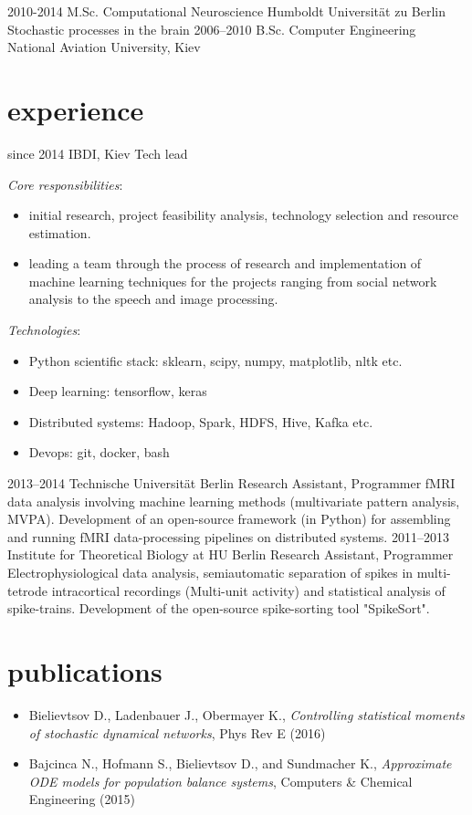 \documentclass[]{cv}
\begin{document}
\begin{entrylist}
  \entry
    {2010-2014}
    {M.Sc. Computational Neuroscience}
    {Humboldt Universität zu Berlin}
    {Stochastic processes in the brain}
  \entry
    {2006–2010}
    {B.Sc. Computer Engineering}
    {National Aviation University, Kiev}
    {}
\end{entrylist}

\section{experience}

\begin{entrylist}
  \entry
    {since 2014}
    {IBDI, Kiev}
    {Tech lead}
    {\emph{Core responsibilities}:
        \begin{itemize}
            \item initial research, project feasibility analysis, technology selection and resource estimation.
            \item leading a team through the process of research and implementation of machine learning techniques for the     projects ranging from social network analysis to the speech and image processing.
        \end{itemize}
    \emph{Technologies}:
        \begin{itemize}
            \item Python scientific stack: sklearn, scipy, numpy, matplotlib, nltk etc.
            \item Deep learning: tensorflow, keras
            \item Distributed systems: Hadoop, Spark, HDFS, Hive, Kafka etc.
            \item Devops: git, docker, bash
        \end{itemize}
    }
  \entry
    {2013–2014}
    {Technische Universität Berlin}
    {Research Assistant, Programmer}
    {fMRI data analysis involving machine learning methods (multivariate pattern analysis, MVPA). Development of an open-source framework (in Python) for assembling and running fMRI data-processing pipelines on distributed systems.}
  \entry
    {2011–2013}
    {Institute for Theoretical Biology at HU Berlin}
    {Research Assistant, Programmer}
    {Electrophysiological data analysis, semiautomatic separation of spikes in multi-tetrode intracortical recordings (Multi-unit activity) and statistical analysis of spike-trains. Development of the open-source spike-sorting tool "SpikeSort".}
\end{entrylist}

\section{publications}
\begin{itemize}
    \item Bielievtsov D., Ladenbauer J., Obermayer K., \textit{Controlling statistical moments of stochastic dynamical networks}, Phys Rev E (2016)
    \item Bajcinca N., Hofmann S., Bielievtsov D., and Sundmacher K., \textit{Approximate ODE models for population balance systems}, Computers \& Chemical Engineering (2015)
\end{itemize}
\end{document}
